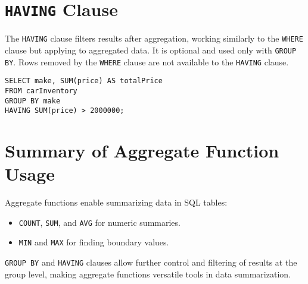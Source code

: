\documentclass{article}
\begin{document}
\section{\texttt{HAVING} Clause}
The \texttt{HAVING} clause filters results after aggregation, working similarly to the \texttt{WHERE} clause but applying to aggregated data. It is optional and used only with \texttt{GROUP BY}. Rows removed by the \texttt{WHERE} clause are not available to the \texttt{HAVING} clause.
\begin{verbatim}
SELECT make, SUM(price) AS totalPrice
FROM carInventory
GROUP BY make
HAVING SUM(price) > 2000000;
\end{verbatim}

\section{Summary of Aggregate Function Usage}
Aggregate functions enable summarizing data in SQL tables:
\begin{itemize}
    \item \texttt{COUNT}, \texttt{SUM}, and \texttt{AVG} for numeric summaries.
    \item \texttt{MIN} and \texttt{MAX} for finding boundary values.
\end{itemize}
\texttt{GROUP BY} and \texttt{HAVING} clauses allow further control and filtering of results at the group level, making aggregate functions versatile tools in data summarization.
\end{document}
